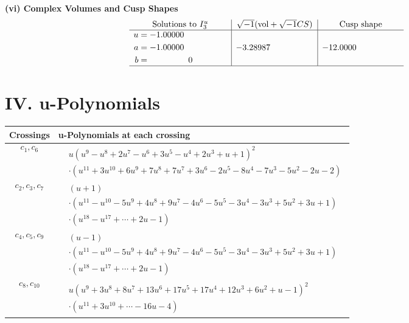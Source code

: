\documentclass[1p]{elsarticle_modified}
\theoremstyle{definition}
\newcommand{\I}{\sqrt{-1}}
\begin{document}
\newpage\flushleft \textbf{(vi) Complex Volumes and Cusp Shapes}
$$\begin{array}{c|c|c}  
\text{Solutions to }I^u_{3}& \I (\text{vol} + \sqrt{-1}CS) & \text{Cusp shape}\\
 \hline 
\begin{aligned}
u &= -1.00000\phantom{ +0.000000I} \\
a &= -1.00000\phantom{ +0.000000I} \\
b &= \phantom{-0.000000 } 0\end{aligned}
 & -3.28987\phantom{ +0.000000I} & -12.0000\phantom{ +0.000000I}\\
 \hline 
 \end{array}$$\newpage
\newpage\renewcommand{\arraystretch}{1}
\centering \section*{ IV. u-Polynomials}
\begin{tabular}{m{50pt}|m{274pt}}
Crossings & \hspace{64pt}u-Polynomials at each crossing \\
\hline $$\begin{aligned}c_{1},c_{6}\end{aligned}$$&$\begin{aligned}
&u(u^9- u^8+2 u^7- u^6+3 u^5- u^4+2 u^3+u+1)^2\\
&\cdot(u^{11}+3 u^{10}+6 u^9+7 u^8+7 u^7+3 u^6-2 u^5-8 u^4-7 u^3-5 u^2-2 u-2)
\end{aligned}$\\
\hline $$\begin{aligned}c_{2},c_{3},c_{7}\end{aligned}$$&$\begin{aligned}
&(u+1)\\
&\cdot(u^{11}- u^{10}-5 u^9+4 u^8+9 u^7-4 u^6-5 u^5-3 u^4-3 u^3+5 u^2+3 u+1)\\
&\cdot(u^{18}- u^{17}+\cdots+2 u-1)
\end{aligned}$\\
\hline $$\begin{aligned}c_{4},c_{5},c_{9}\end{aligned}$$&$\begin{aligned}
&(u-1)\\
&\cdot(u^{11}- u^{10}-5 u^9+4 u^8+9 u^7-4 u^6-5 u^5-3 u^4-3 u^3+5 u^2+3 u+1)\\
&\cdot(u^{18}- u^{17}+\cdots+2 u-1)
\end{aligned}$\\
\hline $$\begin{aligned}c_{8},c_{10}\end{aligned}$$&$\begin{aligned}
&u(u^9+3 u^8+8 u^7+13 u^6+17 u^5+17 u^4+12 u^3+6 u^2+u-1)^2\\
&\cdot(u^{11}+3 u^{10}+\cdots-16 u-4)
\end{aligned}$\\
\hline
\end{tabular}\newpage\renewcommand{\arraystretch}{1}
\end{document}
